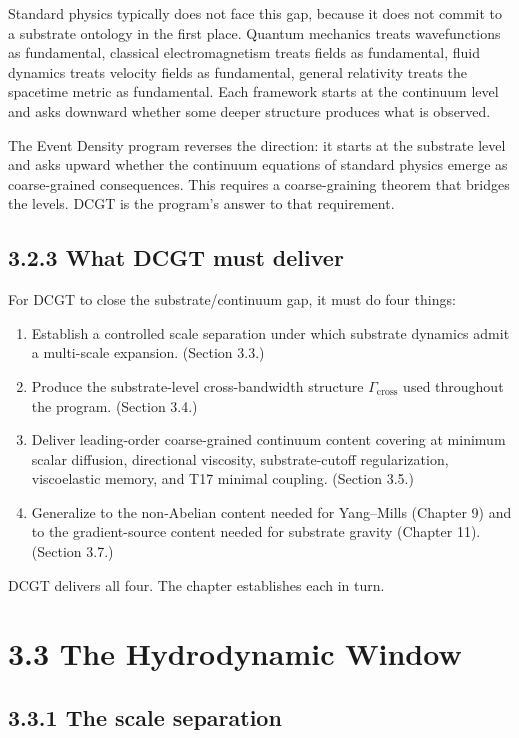 \documentclass[11pt]{book}
\begin{document}
Standard physics typically does not face this gap, because it does not commit to a substrate ontology in the first place. Quantum mechanics treats wavefunctions as fundamental, classical electromagnetism treats fields as fundamental, fluid dynamics treats velocity fields as fundamental, general relativity treats the spacetime metric as fundamental. Each framework starts at the continuum level and asks downward whether some deeper structure produces what is observed.

The Event Density program reverses the direction: it starts at the substrate level and asks upward whether the continuum equations of standard physics emerge as coarse-grained consequences. This requires a coarse-graining theorem that bridges the levels. DCGT is the program's answer to that requirement.

\subsection{3.2.3 What DCGT must deliver}

For DCGT to close the substrate/continuum gap, it must do four things:

\begin{enumerate}
\item Establish a controlled scale separation under which substrate dynamics admit a multi-scale expansion. (Section 3.3.)
\item Produce the substrate-level cross-bandwidth structure $\Gamma_\mathrm{cross}$ used throughout the program. (Section 3.4.)
\item Deliver leading-order coarse-grained continuum content covering at minimum scalar diffusion, directional viscosity, substrate-cutoff regularization, viscoelastic memory, and T17 minimal coupling. (Section 3.5.)
\item Generalize to the non-Abelian content needed for Yang–Mills (Chapter 9) and to the gradient-source content needed for substrate gravity (Chapter 11). (Section 3.7.)
\end{enumerate}

DCGT delivers all four. The chapter establishes each in turn.

\section{3.3 The Hydrodynamic Window}

\subsection{3.3.1 The scale separation}
\end{document}
